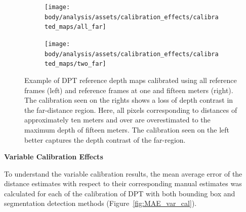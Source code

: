 \begin{figure}[H]
    \centering
    \begin{subfigure}[t]{0.48\textwidth}
        \centering
        \texttt{[image: body/analysis/assets/calibration\_effects/calibrated\_maps/all\_far]}
    \end{subfigure}
    \begin{subfigure}[t]{0.48\textwidth}
        \centering
        \texttt{[image: body/analysis/assets/calibration\_effects/calibrated\_maps/two\_far]}
    \end{subfigure}

    \caption{Example of DPT reference depth maps calibrated using all reference frames (left) and reference
        frames at one and fifteen meters (right). The calibration seen on the rights shows a loss of depth
        contrast in the far-distance region. Here, all pixels corresponding to distances of approximately ten
        meters and over are overestimated to the maximum depth of fifteen meters. The calibration seen on the
        left better captures the depth contrast of the far-region.}
    \label{fig:far_scale}
\end{figure}



%
%


\clearpage

\vspace{5mm}
\textbf{Variable Calibration Effects}

To understand the variable calibration results, the mean average error of the distance estimates
with respect to their corresponding manual estimates was calculated for each of the calibration
of DPT with both bounding box and segmentation detection methods (Figure~\ref{fig:MAE_var_cal}).

